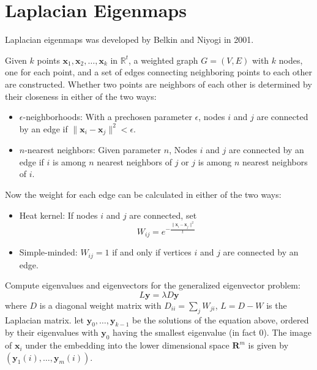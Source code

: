 \section{Laplacian Eigenmaps\label{Sec:DR:LE}}
Laplacian eigenmaps was developed by Belkin and Niyogi in 2001.\cite{BelkinANIPS2001}

Given $k$ points $\mathbf{x}_1, \mathbf{x}_2,\dots, \mathbf{x}_k$ in $\mathbb{R}^t$, a weighted graph $G=(V,E)$ with $k$ nodes, one for each point, and a set of edges connecting neighboring points to each other are constructed. Whether two points are neighbors of each other is determined by their closeness in either of the two ways:
\begin{itemize}
	\item $\epsilon$-neighborhoods: With a prechosen parameter $\epsilon$, nodes $i$ and $j$ are connected by an edge if $\lVert \mathbf{x}_i-\mathbf{x}_j\rVert^2<\epsilon$.
	\item $n$-nearest neighbors: Given parameter $n$, Nodes $i$ and $j$ are connected by an edge if $i$ is among $n$ nearest neighbors of $j$ or $j$ is among $n$ nearest neighbors of $i$.
\end{itemize}

Now the weight for each edge can be calculated in either of the two ways:
\begin{itemize}
	\item Heat kernel: If nodes $i$ and $j$ are connected, set
	\begin{equation}
	    W_{ij}=e^{-\frac{\lVert \mathbf{x}_i-\mathbf{x}_j\rVert^2}{t}}
	\end{equation}
	
	\item Simple-minded: $W_{ij}=1$ if and only if vertices $i$ and $j$ are connected by an edge.
\end{itemize}

Compute eigenvalues and eigenvectors for the generalized eigenvector problem:
\begin{equation}
    L\mathbf{y}=\lambda D\mathbf{y}
\end{equation}
where $D$ is a diagonal weight matrix with $D_{ii}=\sum_j W_{ji}$, $L=D-W$ is the Laplacian matrix. let $\mathbf{y}_0, \dots, \mathbf{y}_{k-1}$ be the solutions of the equation above, ordered by their eigenvalues with $\mathbf{y}_0$ having the smallest eigenvalue (in fact 0). The image of $\mathbf{x}_i$ under the embedding into the lower dimensional space $\mathbf{R}^m$ is given by $(\mathbf{y}_1(i),\dots, \mathbf{y}_m(i))$. 

